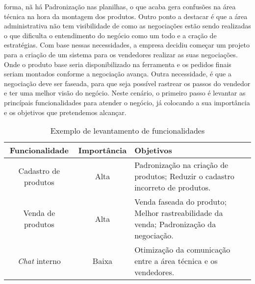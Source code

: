     forma, nã há Padronização nas planilhas, o que acaba gera confusões na área
    técnica na hora da montagem dos produtos. Outro ponto a destacar é que a área
    administrativa não tem visibilidade de como as negociações estão sendo realizadas
    o que dificulta o entendimento do negócio como um todo e a cração de
    estratégias. \newline
    Com base nessas necessidades, a empresa decidiu começar um projeto para a
    criação de um sistema para os vendedores realizar as suas negociações.
    Onde o produto base seria disponibilizado na ferramenta e os pedidos finais
    seriam montados conforme a negociação avança. Outra necessidade, é que a
    negociação deve ser faseada, para que seja possível rastrear os passos do
    vendedor e ter uma melhor visão do negócio. \newline
    Neste cenário, o primeiro passo é levantar as princípais funcionalidades para
    atender o negócio, já colocando a sua importância e os objetivos que pretendemos
    alcançar.

    \begin{table}[h!]
      \centering
      \begin{tabular}{|c|c|p{8cm}|}
        \hline
        \textbf{Funcionalidade} &
        \textbf{Importância}  &
        \textbf{Objetivos} \\ \hline
        Cadastro de produtos &
        Alta &
        Padronização na criação de produtos; \newline
        Reduzir o cadastro incorreto de produtos.
        \\ \hline
        Venda de produtos &
        Alta &
        Venda faseada do produto; \newline
        Melhor rastreabilidade da venda; \newline
        Padronização da negociação.
        \\ \hline
        \textit{Chat} interno &
        Baixa &
        Otimização da comunicação entre a área técnica e os vendedores.
        \\ \hline
      \end{tabular}
      \caption{Exemplo de levantamento de funcionalidades}
      \label{Tabela:2}
    \end{table}

